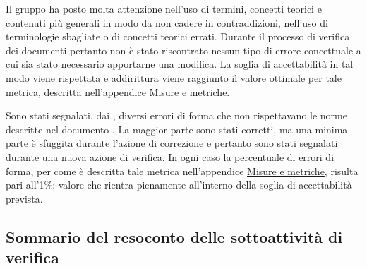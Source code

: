 \documentclass[a4paper, titlepage]{article}
\begin{document}
Il gruppo ha posto molta attenzione nell'uso di termini, concetti teorici e contenuti più generali in modo da non cadere in contraddizioni, nell'uso di terminologie sbagliate o di concetti teorici errati. Durante il processo di verifica dei documenti pertanto non è stato riscontrato nessun tipo di errore concettuale a cui sia stato necessario apportarne una modifica. 
\newline La soglia di accettabilità in tal modo viene rispettata e addirittura viene raggiunto il valore ottimale per tale metrica, descritta nell'appendice \hyperref[sec:metr]{Misure e metriche}.

Sono stati segnalati, dai , diversi errori di forma che non rispettavano le norme descritte nel documento . La maggior parte sono stati corretti, ma una minima parte è sfuggita durante l'azione di correzione e pertanto sono stati segnalati durante una nuova azione di verifica.
\newline In ogni caso la percentuale di errori di forma, per come è descritta tale metrica nell'appendice \hyperref[sec:metr]{Misure e metriche}, risulta pari all'1\%; valore che rientra pienamente all'interno della soglia di accettabilità prevista.


\subsection {Sommario del resoconto delle sottoattività di verifica}
\end{document}
